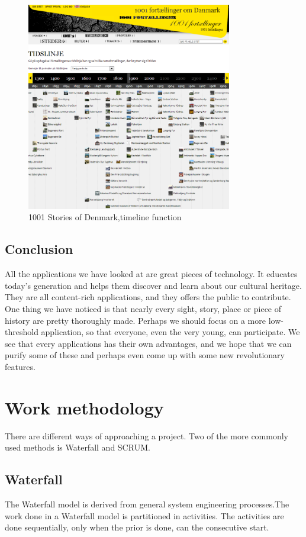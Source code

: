 \documentclass[11pt]{book}
\begin{document}
\begin{figure}[H]
      \centering
      \includegraphics[width=0.8\textwidth]{Figures/Prestudy/1001storiesWebsiteTimeline.png}
      \caption{1001 Stories of Denmark,timeline function}
      \label{fig:pre_1001StoriesDenmarkTimeLine}
\end{figure}

\subsection{Conclusion}
All the applications we have looked at are great pieces of technology. It educates today's generation and helps them discover and learn about our cultural heritage. They are all content-rich applications, and they offers the public to contribute. One thing we have noticed is that nearly every sight, story, place or piece of history are pretty thoroughly made. Perhaps we should focus on a more low-threshold application, so that everyone, even the very young, can participate.
We see that every applications has their own advantages, and we hope that we can purify some of these and perhaps even come up with some new revolutionary features.


\section{Work methodology}
There are different ways of approaching a project. Two of the more commonly used methods is Waterfall and SCRUM.

\subsection{Waterfall}
The Waterfall model \cite[p. 30-32]{Sommerville10} is derived from general system engineering processes.The work done in a Waterfall model is partitioned in activities. The activities are done sequentially, only when the prior is done, can the consecutive start.
\end{document}
